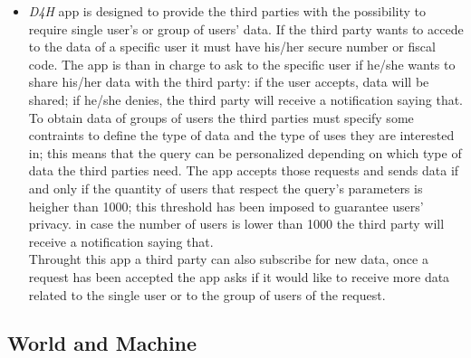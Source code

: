 \begin{itemize}
	\item{\textit{D4H} app is designed to provide the third parties with the possibility to require single user's or group of users' data.
		If the third party wants to accede to the data of  a specific user it must have his/her secure number or fiscal code. The app is than in charge to ask to the specific user if he/she wants to share his/her data with the third party: if the user accepts, data will be shared; if he/she denies, the third party will receive a notification saying that.\\
		To obtain data of groups of users the third parties must specify some contraints to define the type of data and the type of uses they are interested in; this means that the query can be personalized depending on which type of data the third parties need. The app accepts those requests and sends data if and only if the quantity of users that respect the query's parameters is heigher than 1000; this threshold has been imposed to guarantee users' privacy. in case the number of users is lower than 1000 the third party will receive a notification saying that.\\
		Throught this app a third party can also subscribe for new data, once a request has been accepted the app asks if it would like to receive more data related to the single user or to the group of users of the request.}
		
\end{itemize}

\subsection{World and Machine}